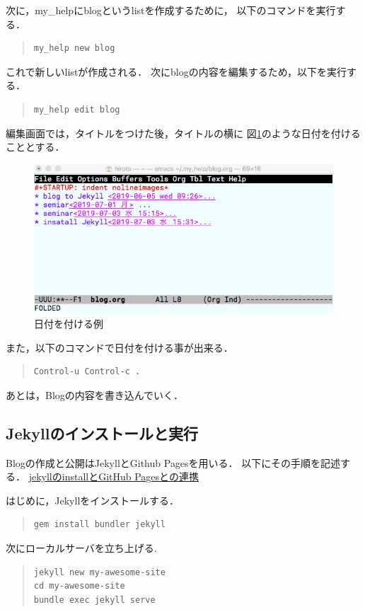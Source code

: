 \documentclass{hissymp}
\begin{document}
次に，my\_helpにblogというlistを作成するために，
以下のコマンドを実行する．

\begin{quote}
\begin{verbatim}
my_help new blog
\end{verbatim}
\end{quote}

これで新しいlistが作成される．
次にblogの内容を編集するため，以下を実行する．
\begin{quote}
\begin{verbatim}
my_help edit blog
\end{verbatim}
\end{quote}

編集画面では，タイトルをつけた後，タイトルの横に
図\ref{fig:org2659c98}のような日付を付けることとする．
\begin{figure}[htbp]
\centering
\includegraphics[width=13cm]{./images/add_date.png}
\caption{\label{fig:org2659c98}
日付を付ける例}
\end{figure}

また，以下のコマンドで日付を付ける事が出来る．
\begin{quote}
\begin{verbatim}
Control-u Control-c .
\end{verbatim}
\end{quote}

あとは，Blogの内容を書き込んでいく．

\subsection{Jekyllのインストールと実行}
\label{sec:org4d2ad32}
Blogの作成と公開はJekyllとGithub Pagesを用いる．
以下にその手順を記述する．
\href{https://qiita.com/daddygongon/items/9b7182db29861744fc79}{jekyllのinstallとGitHub Pagesとの連携}

はじめに，Jekyllをインストールする．
\begin{quote}
\begin{verbatim}
gem install bundler jekyll
\end{verbatim}
\end{quote}

次にローカルサーバを立ち上げる.
\begin{quote}
\begin{verbatim}
jekyll new my-awesome-site
cd my-awesome-site
bundle exec jekyll serve
\end{verbatim}
\end{quote}
\end{document}
